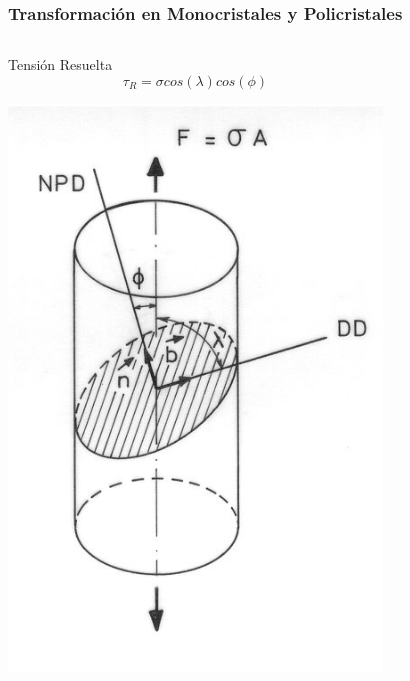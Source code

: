 \documentclass[usenames,dvipsnames]{beamer}
\begin{document}

\begin{frame}
\frametitle{Transformación en Monocristales y Policristales}

\begin{columns}

\begin{block}{Tensión Resuelta}
\begin{equation*}
 \tau_{R}= \sigma cos(\lambda)cos(\phi)
\end{equation*}

\begin{center}
\includegraphics[width=0.5\columnwidth]{img/intro/tension.png}
\end{center}

\end{block}



\end{columns}
\end{frame}
\end{document}
